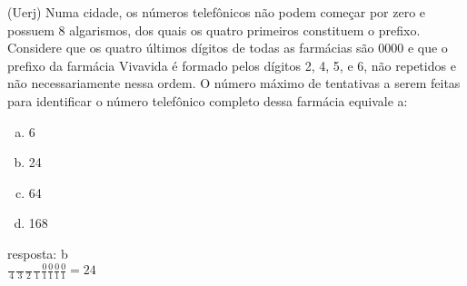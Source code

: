 \begin{ex}
(Uerj) Numa cidade, os números telefônicos não podem começar por zero e possuem 8 algarismos, dos quais os quatro primeiros constituem o prefixo.	Considere que os quatro últimos dígitos de todas as farmácias são 0000 e que o prefixo da farmácia Vivavida é formado pelos dígitos 2, 4, 5, e 6, não repetidos e não necessariamente nessa ordem.
O número máximo de tentativas a serem feitas para identificar o número telefônico completo dessa farmácia equivale a:
   \begin{enumerate}[(a)]
   \item 6
   \item 24
   \item 64
   \item 168
   \end{enumerate}
     \begin{sol}
     resposta: b \\
     $\frac{\phantom{A}}{4}\frac{\phantom{A}}{3}\frac{\phantom{A}}{2}\frac{\phantom{A}}{1}\frac{0}{1}\frac{0}{1}\frac{0}{1}\frac{0}{1} = 24 $
     \end{sol}
\end{ex}